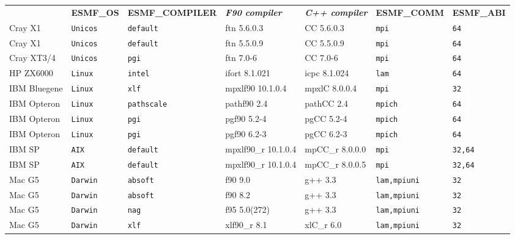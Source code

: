 \begin{tabular}{lllllll}
  &{\bfseries\footnotesize ESMF\_OS} &{\bfseries\footnotesize ESMF\_COMPILER} & {\bfseries\footnotesize\it F90 compiler} & {\bfseries\footnotesize\it C++ compiler} & {\bfseries\footnotesize ESMF\_COMM} & {\bfseries\footnotesize ESMF\_ABI} \\

Cray X1         &\tt Unicos &\tt default & ftn \footnotesize 5.6.0.3 & CC \footnotesize 5.6.0.3 &\tt mpi &\tt 64 \\
Cray X1         &\tt Unicos &\tt default & ftn \footnotesize 5.5.0.9 & CC \footnotesize 5.5.0.9 &\tt mpi &\tt 64 \\
Cray XT3/4      &\tt Unicos &\tt pgi     & ftn \footnotesize 7.0-6   & CC \footnotesize 7.0-6   &\tt mpi &\tt 64 \\
HP ZX6000       &\tt Linux  &\tt intel   & ifort \footnotesize 8.1.021 & icpc \footnotesize 8.1.024 &\tt lam &\tt 64 \\
IBM Bluegene    &\tt Linux  &\tt xlf     & mpxlf90 \footnotesize 10.1.0.4 & mpxlC \footnotesize 8.0.0.4 &\tt mpi &\tt 32 \\
IBM Opteron     &\tt Linux  &\tt pathscale & pathf90 \footnotesize 2.4 & pathCC \footnotesize 2.4 &\tt mpich &\tt 64 \\
IBM Opteron     &\tt Linux  &\tt pgi     & pgf90 \footnotesize 5.2-4 & pgCC \footnotesize 5.2-4 &\tt mpich   &\tt 64 \\
IBM Opteron     &\tt Linux  &\tt pgi     & pgf90 \footnotesize 6.2-3 & pgCC \footnotesize 6.2-3 &\tt mpich   &\tt 64 \\
IBM SP          &\tt AIX    &\tt default & mpxlf90\_r \footnotesize 10.1.0.4 & mpCC\_r \footnotesize 8.0.0.0 &\tt mpi &\tt 32,64 \\
IBM SP          &\tt AIX    &\tt default & mpxlf90\_r \footnotesize 10.1.0.4 & mpCC\_r \footnotesize 8.0.0.5 &\tt mpi &\tt 32,64 \\
Mac G5          &\tt Darwin &\tt absoft  & f90 \footnotesize 9.0     & g++ \footnotesize 3.3    &\tt lam,mpiuni &\tt 32 \\
Mac G5          &\tt Darwin &\tt absoft  & f90 \footnotesize 8.2     & g++ \footnotesize 3.3    &\tt lam,mpiuni &\tt 32 \\
Mac G5          &\tt Darwin &\tt nag     & f95 \footnotesize 5.0(272)& g++ \footnotesize 3.3    &\tt lam,mpiuni &\tt 32 \\
Mac G5          &\tt Darwin &\tt xlf     & xlf90\_r \footnotesize 8.1& xlC\_r \footnotesize 6.0 &\tt lam,mpiuni &\tt 32 \\

\end{tabular}

